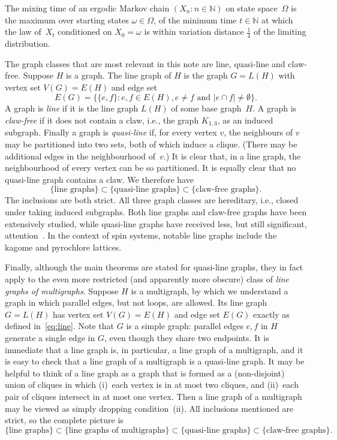 \documentclass[11pt]{amsart}
\newcommand{\Nset}{\mathbb{N}}
\begin{document}
The mixing time of an ergodic Markov chain $(X_n:n\in\Nset)$ on state space~$\Omega$ is the maximum over starting states $\omega\in\Omega$, of the minimum time $t\in\Nset$ at which the law of~$X_t$ conditioned on $X_0=\omega$ is within variation distance $\frac14$ of the limiting distribution.

The graph classes that are most relevant in this note are line, quasi-line and claw-free.  Suppose $H$ is a graph.  The line graph of $H$ is the graph $G=L(H)$ with vertex set $V(G)=E(H)$ and edge set
\begin{equation}\label{eq:line}
E(G)=\big\{\{e,f\}:e,f\in E(H), e\not=f\text{ and }|e\cap f|\not=\emptyset\big\}.
\end{equation}
A graph is \emph{line} if it is the line graph $L(H)$ of some base graph~$H$.  A graph is \emph{claw-free} if it does not contain a claw, i.e., the graph $K_{1,3}$, as an induced subgraph.  Finally a graph is \emph{quasi-line} if, for every vertex $v$, the neighbours of $v$ may be partitioned into two sets, both of which induce a clique.  (There may be additional edges in the neighbourhood of~$v$.)  It is clear that, in a line graph, the neighbourhood of every vertex can be so partitioned.  It is equally clear that no quasi-line graph contains a claw.  We therefore have 
$$
\{\text{line graphs}\}\subset \{\text{quasi-line graphs}\}\subset \{\text{claw-free graphs}\}.
$$
The inclusions are both strict.  All three graph classes are hereditary, i.e., closed under taking induced subgraphs. Both line graphs and claw-free graphs have been extensively studied, while quasi-line graphs have received less, but still significant, attention~\cite{ChudnovskySeymourQuasi}.  In the context of spin systems, notable line graphs include the kagome and pyrochlore lattices.

Finally, although the main theorems are stated for quasi-line graphs, they in fact apply to the even more restricted (and apparently more obscure) class of \emph{line graphs of multigraphs}.  Suppose $H$ is a multigraph, by which we understand a graph in which parallel edges, but not loops, are allowed.  Its line graph $G=L(H)$ has vertex set $V(G)=E(H)$ and edge set $E(G)$ exactly as defined in~\eqref{eq:line}.  Note that $G$ is a simple graph:  parallel edges $e,f$ in $H$ generate a single edge in $G$, even though they share two endpoints.  It is immediate that a line graph is, in particular, a line graph of a multigraph, and it is easy to check that a line graph of a multigraph is a quasi-line graph.  It may be helpful to think of a line graph as a graph that is formed as a (non-disjoint) union of cliques in which (i)~each vertex is in at most two cliques, and (ii)~each pair of cliques intersect in at most one vertex.  Then a line graph of a multigraph may be viewed as simply dropping condition~(ii). All inclusions mentioned are strict, so the complete picture is 
$$
\{\text{line graphs}\}\subset \{\text{line graphs of multigraphs}\}\subset\{\text{quasi-line graphs}\}\subset \{\text{claw-free graphs}\}.
$$
\end{document}
